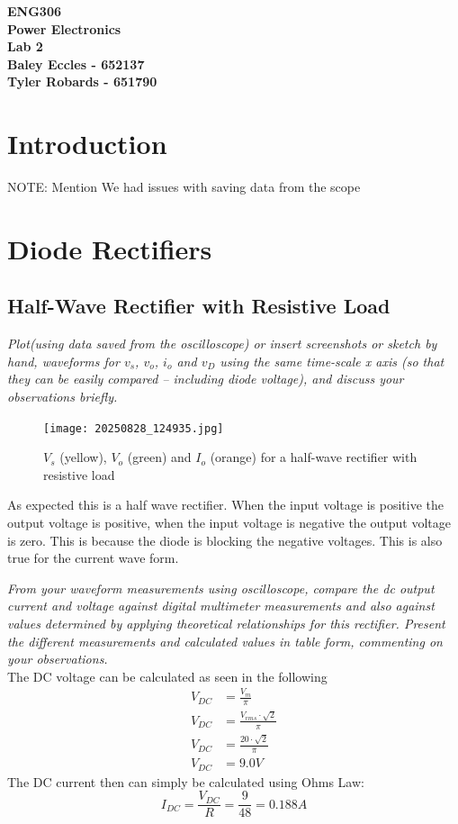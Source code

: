 \documentclass[12pt,a4paper]{article}
\begin{document}
\begin{center}
\textbf{\LARGE ENG306\\[6pt]
Power Electronics}\\[10pt]
\textbf{\large Lab 2\\[4pt]
Baley Eccles - 652137\\
Tyler Robards - 651790}\\
\end{center}

\tableofcontents
\newpage
\section{Introduction}
NOTE: Mention We had issues with saving data from the scope
\section{Diode Rectifiers}
\subsection{Half-Wave Rectifier with Resistive Load}
\textit{Plot(using data saved from the oscilloscope) or insert screenshots or sketch by hand, 
waveforms for $v_s$, $v_o$, $i_o$ and $v_D$ using the same time-scale x axis (so that they can be
easily compared – including diode voltage), and discuss your observations briefly.}\\

\begin{figure}[H]
\centering
\texttt{[image: 20250828\_124935.jpg]}
\caption{\(V_s\) (yellow), \(V_o\) (green) and \(I_o\) (orange) for a half-wave rectifier with resistive load \label{fig:figure1}}
\end{figure}

As expected this is a half wave rectifier. When the input voltage is positive the output voltage is positive, when the input voltage is negative the output voltage is zero. This is because the diode is blocking the negative voltages. This is also true for the current wave form.

\textit{From your waveform measurements using oscilloscope, compare the dc output current 
and voltage against digital multimeter measurements and also against values determined by applying 
theoretical relationships for this rectifier. Present the different measurements and calculated 
values in table form, commenting on your observations.}\\

The DC voltage can be calculated as seen in the following
\begin{align*}
V_{DC} &= \frac{V_m}{\pi} \\
V_{DC} &= \frac{V_{rms}\cdot\sqrt{2}}{\pi} \\
V_{DC} &= \frac{20\cdot\sqrt{2}}{\pi} \\
V_{DC} &= 9.0V
\end{align*}
The DC current then can simply be calculated using Ohms Law:
\[I_{DC} = \frac{V_{DC}}{R} = \frac{9}{48} = 0.188A\]
\end{document}
